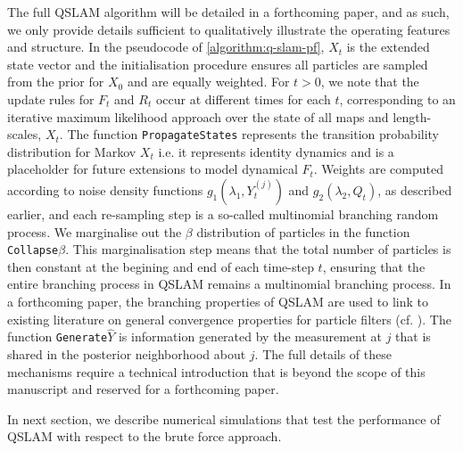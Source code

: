 The full QSLAM algorithm will be detailed in a forthcoming paper, and as such, we only provide details sufficient to qualitatively illustrate the operating features and structure. In the pseudocode of \cref{algorithm:q-slam-pf}, $X_t$ is the extended state vector and the initialisation procedure ensures all particles are sampled from the prior for $X_0$ and are equally weighted. For $t>0$, we note that the update rules for $F_t$ and $R_t$ occur at different times for each $t$, corresponding to an iterative maximum likelihood approach over the state of all maps and length-scales, $X_t$. The function \texttt{PropagateStates} represents the transition probability distribution for Markov $X_t$ i.e. it represents identity dynamics and is a placeholder for future extensions to model dynamical $F_t$. Weights are computed according to noise density functions  $g_1(\lambda_1, Y_t^{(j)})$ and $g_2(\lambda_2, Q_t)$, as described earlier, and each re-sampling step is a so-called multinomial branching random process. We marginalise out the $\beta$ distribution of particles in the function \texttt{Collapse$\beta$}. This marginalisation step  means that the total number of particles is then constant at the begining and end of each time-step $t$, ensuring that the entire branching process in QSLAM remains a multinomial branching process. In a forthcoming paper, the branching properties of QSLAM are used to link to existing literature on general convergence properties for particle filters (cf. \cite{bain2009}).  The function \texttt{Generate$\hat{Y}$} is information generated by the measurement at $j$ that is shared in the posterior neighborhood about $j$. The full details of these mechanisms require a technical introduction that is beyond the scope of this manuscript and reserved for a forthcoming paper. 

In next section, we describe numerical simulations that test the performance of QSLAM with respect to the brute force approach. 



